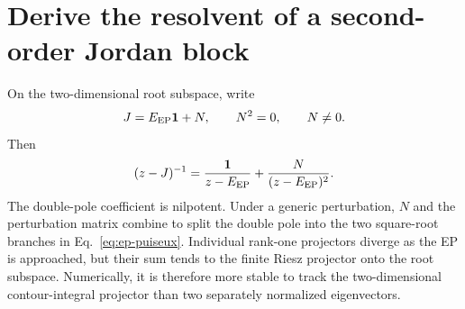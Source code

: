 \section{Derive the resolvent of a second-order Jordan block}
\label{app:jordan-resolvent}

On the two-dimensional root subspace, write
\begin{equation}
  J=E_{\mathrm{EP}}\mathbf{1}+N,
  \qquad N^2=0,
  \qquad N\ne0 .
  \label{eq:jordan-nilpotent}
\end{equation}
Then
\begin{equation}
  (z-J)^{-1}
  =\frac{\mathbf{1}}{z-E_{\mathrm{EP}}}
  +\frac{N}{(z-E_{\mathrm{EP}})^2} .
  \label{eq:jordan-resolvent}
\end{equation}
The double-pole coefficient is nilpotent.  Under a generic perturbation,
$N$ and the perturbation matrix combine to split the double pole into the two
square-root branches in Eq.~\eqref{eq:ep-puiseux}.  Individual rank-one
projectors diverge as the EP is approached, but their sum tends to the finite
Riesz projector onto the root subspace.  Numerically, it is therefore more
stable to track the two-dimensional contour-integral projector than two
separately normalized eigenvectors.
